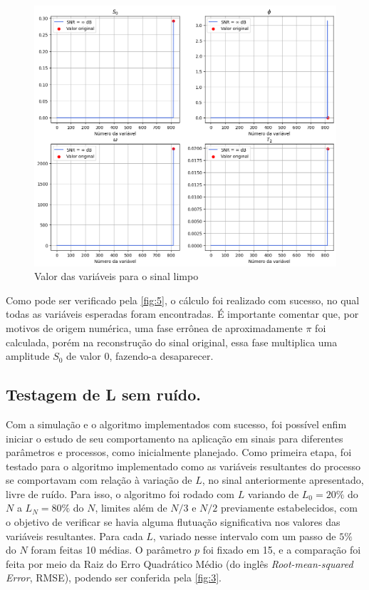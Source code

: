 \documentclass[12pt]{article}
\begin{document}
\begin{figure} [H]
    \centering
    \includegraphics[scale=0.625]{var-0.png}
    \caption{Valor das variáveis para o sinal limpo}
    \label{fig:5}
\end{figure}

Como pode ser verificado pela \autoref{fig:5}, o cálculo foi realizado com sucesso, no qual todas as variáveis esperadas foram encontradas. É importante comentar 
que, por motivos de origem numérica, uma fase errônea de aproximadamente $\pi$ foi calculada, porém na reconstrução do sinal original, essa fase multiplica uma 
amplitude $S_0$ de valor 0, fazendo-a desaparecer. 

\subsection{Testagem de L sem ruído.}
Com a simulação e o algoritmo implementados com sucesso, foi possível enfim iniciar o estudo de seu comportamento na aplicação em sinais para 
diferentes parâmetros e processos, como inicialmente planejado. Como primeira etapa, foi testado para o algoritmo implementado como as variáveis resultantes do 
processo se comportavam com relação à variação de $L$, no sinal anteriormente apresentado, livre de ruído. Para isso, o algoritmo foi rodado 
com $L$ variando de $L_0 = 20\%$ do $N$ a $L_N = 80\%$ do $N$, limites além de $N/3$ e $N/2$ previamente estabelecidos, com o objetivo de verificar 
se havia alguma flutuação significativa nos valores das variáveis resultantes. Para cada $L$, variado nesse intervalo com um passo de $5\%$ do $N$ 
foram feitas 10 médias. O parâmetro $p$ foi fixado em 15, e a comparação foi feita por meio da 
Raiz do Erro Quadrático Médio (do inglês \textit{Root-mean-squared Error}, RMSE), podendo ser conferida pela \autoref{fig:3}.
\end{document}
